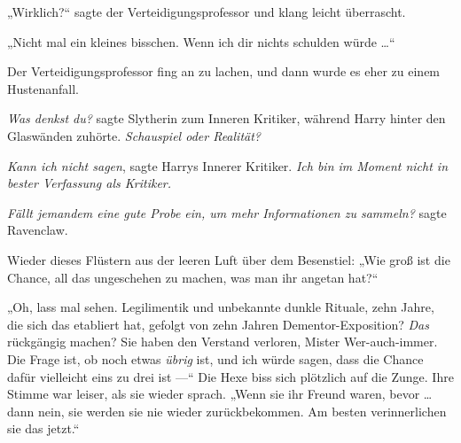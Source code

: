 „Wirklich?“ sagte der Verteidigungsprofessor und klang leicht überrascht.

„Nicht mal ein kleines bisschen. Wenn ich dir nichts schulden würde …“

Der Verteidigungsprofessor fing an zu lachen, und dann wurde es eher zu einem Hustenanfall.

\emph{Was denkst du?} sagte Slytherin zum Inneren Kritiker, während Harry hinter den Glaswänden zuhörte. \emph{Schauspiel oder Realität?}

\emph{Kann ich nicht sagen}, sagte Harrys Innerer Kritiker. \emph{Ich bin im Moment nicht in bester Verfassung als Kritiker.}

\emph{Fällt jemandem eine gute Probe ein, um mehr Informationen zu sammeln?} sagte Ravenclaw.

Wieder dieses Flüstern aus der leeren Luft über dem Besenstiel:
„Wie groß ist die Chance, all das ungeschehen zu machen, was man ihr angetan hat?“

„Oh, lass mal sehen. Legilimentik und unbekannte dunkle Rituale, zehn Jahre, die sich das etabliert hat, gefolgt von zehn Jahren Dementor-Exposition? \emph{Das} rückgängig machen? Sie haben den Verstand verloren, Mister Wer-auch-immer. Die Frage ist, ob noch etwas \emph{übrig} ist, und ich würde sagen, dass die Chance dafür vielleicht eins zu drei ist —“ Die Hexe biss sich plötzlich auf die Zunge. Ihre Stimme war leiser, als sie wieder sprach.
„Wenn sie ihr Freund waren, bevor … dann nein, sie werden sie nie wieder zurückbekommen. Am besten verinnerlichen sie das jetzt.“

